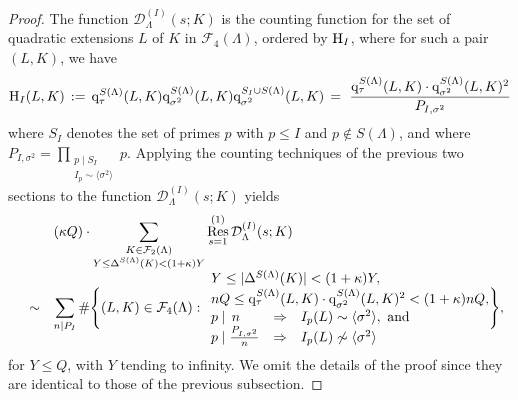 \documentclass[10pt]{article}
\theoremstyle{plain}
\theoremstyle{definition}
\theoremstyle{remark}
\DeclareMathOperator{\Res}{Res}
\def\Disc{{\Delta}}
\def\FF{{\mathcal F}}
\def\I{{\mathcal I}}
\def\H{{\rm H}}
\def\cD{{\mathcal D}}
\def\cF{{\mathcal F}}
\newcommand{\q}{{\rm q}}
\begin{document}
\begin{proof}
The function $\cD^{(I)}_\Lambda(s;K)$ is the counting function for the set of
quadratic extensions $L$ of $K$ in $\FF_4(\Lambda)$, ordered by $\H_I$, where for such a pair $(L,K)$, we have
\begin{equation*}
  \H_I(L,K)\, :=\, \q_{\tau}^{S(\Lambda)}(L,K)
    {\q_{\sigma^2}^{S(\Lambda)}(L,K)}
    {\q_{\sigma^2}^{S_I\cup S(\Lambda)}(L,K)} \, =
    \, \, \frac{\q_{\tau}^{S(\Lambda)}(L,K)
      \cdot \q_{\sigma^2}^{S(\Lambda)}(L,K)^2}{P_{I,\sigma^2}}
\end{equation*}
where $S_I$ denotes the set of primes $p$ with $p\leq I$ and $p\not\in
S(\Lambda)$, and where $P_{I,\sigma^2} = \displaystyle\prod_{\substack{p\mid
    S_I\\I_p \sim \langle\sigma^2\rangle}}p$. Applying the counting
techniques of the previous two sections to the function
$\cD_\Lambda^{(I)}(s;K)$ yields
\begin{equation}\label{slide}
\begin{array}{rcl}
&&\displaystyle (\kappa Q)\cdot
\sum_{\substack{K\in\FF_2(\Lambda)\\Y\leq \Disc^{S(\Lambda)}(K)<(1+\kappa)Y}}
\Res^{(1)}_{s=1}\cD_\Lambda^{(I)}(s;K)
\\[.2in]&\sim &
\displaystyle\sum_{n\mid P_I} \#\Biggr\{(L,K) \in \cF_4(\Lambda):
\begin{array}{lcl} 
\multicolumn{3}{l}{ Y \leq |\Disc^{S(\Lambda)}(K)| < (1+\kappa)Y,} \vspace{1pt} \\
\multicolumn{3}{l}{ nQ \leq \q_{\tau}^{S(\Lambda)}(L,K)\cdot\q_{\sigma^2}^{S(\Lambda)}(L,K)^2<(1 + \kappa)nQ,}\vspace{1pt}\\
 p\mid \, n&\Rightarrow& I_p(L)\sim \langle \sigma^2 \rangle,\text{ and }\\
 p\mid \frac{P_{I,\sigma^2}}{n}&\Rightarrow&I_p(L)\not\sim\langle\sigma^2\rangle
\end{array}\hspace{-5pt}
\Biggr\},
\end{array}
\end{equation}
for $Y\leq Q$, with $Y$ tending to infinity. We omit the details of
the proof since they are identical to those of the previous
subsection.


\end{proof}
\end{document}
